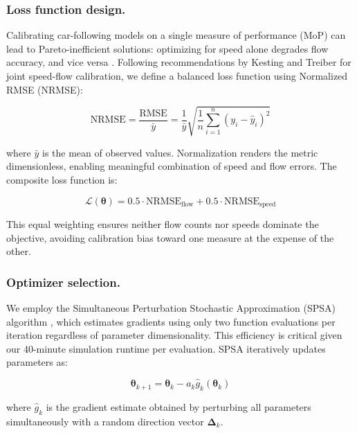 \documentclass{scspaperproc}
\theoremstyle{scsthe}
\begin{document}
    \subsubsection{Loss function design.} Calibrating car-following models on a single
    measure of performance (MoP) can lead to Pareto-inefficient solutions: optimizing
    for speed alone degrades flow accuracy, and vice versa \cite{punzo2021calibration}.
    Following recommendations by Kesting and Treiber \cite{kesting2008calibrating} for
    joint speed-flow calibration, we define a balanced loss function using Normalized
    RMSE (NRMSE):

    \begin{equation}
        \text{NRMSE} = \frac{\text{RMSE}}{\bar{y}} = \frac{1}{\bar{y}} \sqrt{\frac{1}{n} \sum_{i=1}^{n} (y_i - \hat{y}_i)^2}
    \end{equation}

    where $\bar{y}$ is the mean of observed values. Normalization renders the metric
    dimensionless, enabling meaningful combination of speed and flow errors. The
    composite loss function is:

    \begin{equation}
        \mathcal{L}(\boldsymbol{\theta}) = 0.5 \cdot \text{NRMSE}_{\text{flow}} + 0.5 \cdot \text{NRMSE}_{\text{speed}}
    \end{equation}

    This equal weighting ensures neither flow counts nor speeds dominate the objective,
    avoiding calibration bias toward one measure at the expense of the other.

    \subsubsection{Optimizer selection.} We employ the Simultaneous Perturbation Stochastic
    Approximation (SPSA) algorithm \cite{spall2002implementation}, which estimates
    gradients using only two function evaluations per iteration regardless of parameter
    dimensionality. This efficiency is critical given our 40-minute simulation runtime
    per evaluation. SPSA iteratively updates parameters as:

    \begin{equation}
        \boldsymbol{\theta}_{k+1} = \boldsymbol{\theta}_k - a_k \hat{g}_k(\boldsymbol{\theta}_k)
    \end{equation}

    where $\hat{g}_k$ is the gradient estimate obtained by perturbing all parameters
    simultaneously with a random direction vector $\boldsymbol{\Delta}_k$.
\end{document}
